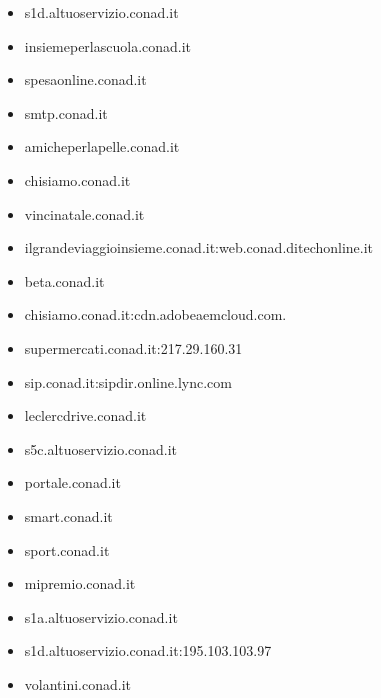 \documentclass{article}
\begin{document}
\begin{itemize}
        \item s1d.altuoservizio.conad.it
    
        \item insiemeperlascuola.conad.it
    
        \item spesaonline.conad.it
    
        \item smtp.conad.it
    
        \item amicheperlapelle.conad.it
    
        \item chisiamo.conad.it
    
        \item vincinatale.conad.it
    
        \item ilgrandeviaggioinsieme.conad.it:web.conad.ditechonline.it
    
        \item beta.conad.it
    
        \item chisiamo.conad.it:cdn.adobeaemcloud.com.
    
        \item supermercati.conad.it:217.29.160.31
    
        \item sip.conad.it:sipdir.online.lync.com
    
        \item leclercdrive.conad.it
    
        \item s5c.altuoservizio.conad.it
    
        \item portale.conad.it
    
        \item smart.conad.it
    
        \item sport.conad.it
    
        \item mipremio.conad.it
    
        \item s1a.altuoservizio.conad.it
    
        \item s1d.altuoservizio.conad.it:195.103.103.97
    
        \item volantini.conad.it
    

\end{itemize}
\end{document}
